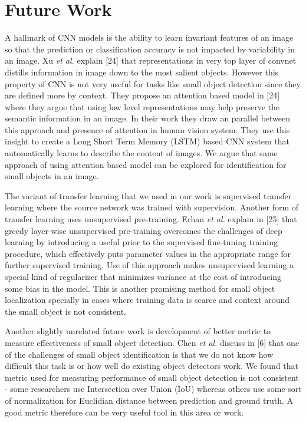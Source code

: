 \documentclass [11pt,letterpaper ,twoside ,openany ]{report}
\begin{document}
    \chapter{Future Work}
    \doublespacing
    A hallmark of CNN models is the ability to learn invariant features of an image so that the prediction or classification accuracy is not impacted by variability in an image. Xu \textit {et al.} explain [24] that representations in very top layer of convnet distills information in image down to the most salient objects. However this property of CNN is not very useful for tasks like small object detection since they are defined more by context. They propose an attention based model in [24] where they argue that using low level representations may help preserve the semantic information in an image. In their work they draw an parallel between this approach and presence of attention in human vision system. They use this insight to create a Long Short Term Memory (LSTM) based CNN system that automatically learns to describe the content of images. We argue that same approach of using attention based model can be explored for identification for small objects in an image.

    The variant of transfer learning that we used in our work is supervised transfer learning where the source network was trained with supervision. Another form of transfer learning uses unsupervised pre-training. Erhan \textit {et al.} explain in [25] that greedy layer-wise unsupervised pre-training overcomes the challenges of deep learning by introducing a useful prior to the supervised fine-tuning training procedure, which effectively puts parameter values in the appropriate range for further supervised training. Use of this approach makes unsupervised learning a special kind of regularizer that minimizes variance at the cost of introducing some bias in the model. This is another promising method for small object localization specially in cases where training data is scarce and context around the small object is not consistent.

    Another slightly unrelated future work is development of better metric to measure effectiveness of small object detection. Chen \textit {et al.} discuss in [6] that one of the challenges of small object identification is that we do not know how difficult this task is or how well do existing object detectors work. We found that metric used for measuring performance of small object detection is not consistent - some researchers use Intersection over Union (IoU) whereas others use some sort of normalization for Euclidian distance between prediction and ground truth. A good metric therefore can be very useful tool in this area or work.
\end{document}
